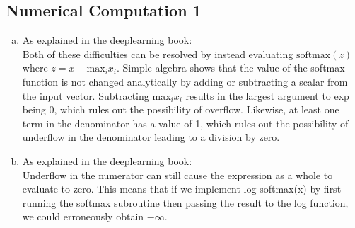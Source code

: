 \documentclass[12pt]{article}
\begin{document}
\subsection{Numerical Computation 1}

\begin{enumerate}[a)]
    \item 
        As explained in the deeplearning book:\\
        Both of these difficulties can be resolved by instead evaluating $\text{softmax}(z)$ where $z = x - \text{max}_i x_i$. Simple algebra shows that the value of the softmax function is not changed analytically by adding or subtracting a scalar from the input vector. Subtracting $\text{max}_i x_i$ results in the largest argument to exp being 0, which rules out the possibility of overflow. Likewise, at least one term in the denominator has a value of 1, which rules out the possibility of underflow in the denominator leading to a division by zero.
    \item
        As explained in the deeplearning book:\\
        Underflow in the numerator can still cause the expression as a whole to evaluate to zero. This means that if we implement log softmax(x) by first running the softmax subroutine then passing the result to the log function, we could erroneously obtain $-\infty$.
\end{enumerate}
\end{document}
